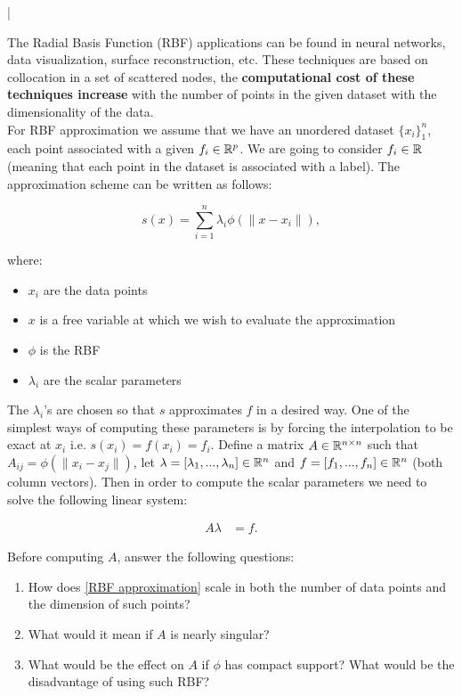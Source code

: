\documentclass[11pt]{article}
\begin{document}
\lstset{frameround=fttt,language=Matlab}

\lstMakeShortInline[columns=fixed]|




The Radial Basis Function (RBF) applications can be found in neural networks, data visualization, surface reconstruction, etc. These techniques are based on collocation in a set of scattered nodes, the \textbf{computational cost of these techniques increase} with the number of points in the given dataset with the dimensionality of the data. \\

For RBF approximation we assume that we have an unordered dataset $\{x_i\}_{1}^n$, each point associated with a given $f_i \in \mathbb{R}^p$. We are going to consider $f_i \in \mathbb{R}$ (meaning that each point in the dataset is associated with a label). The approximation scheme can be written as follows:

\[ s(x) = \sum_{i = 1}^n \lambda_{i} \phi\left( \|x - x_i\| \right), \]

where:

\begin{itemize}
    \item $x_i$ are the data points
    \item $x$ is a free variable at which we wish to evaluate the approximation
    \item $\phi$ is the RBF
    \item $\lambda_i$ are the scalar parameters
\end{itemize}

The $\lambda_i$'s are chosen so that $s$ approximates $f$ in a desired way. One of the simplest ways of computing these parameters is by forcing the interpolation to be exact at $x_i$ i.e. $s(x_i) = f(x_i) = f_i$. Define a matrix $A \in \mathbb{R}^{n \times n}$ such that $A_{ij} = \phi( \|x_i - x_j\|)$, let $\lambda = [\lambda_1, ..., \lambda_n] \in \mathbb{R}^{n}$ and $f = [f_1, ..., f_n] \in \mathbb{R}^n$ (both column vectors). Then in order to compute the scalar parameters we need to solve the following linear system:

\begin{align}
A \lambda &= f. \label{RBF approximation}
\end{align}

Before computing $A$, answer the following questions:

\begin{enumerate}
    \item How does \ref{RBF approximation} scale in both the number of data points and the dimension of such points?
    \item What would it mean if $A$ is nearly singular?
    \item What would be the effect on $A$ if $\phi$ has compact support? What would be the disadvantage of using such RBF?
\end{enumerate}
\end{document}
